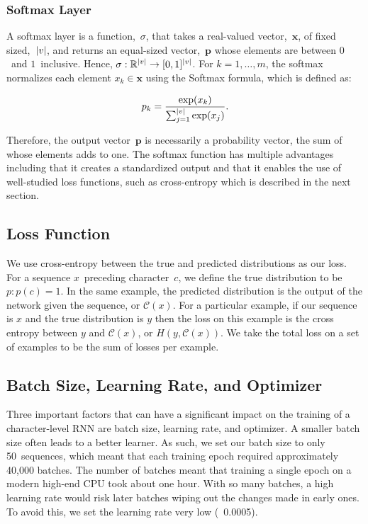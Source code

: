 \documentclass{article}
\DeclarePairedDelimiter\abs{\lvert}{\rvert}%
\begin{document}
\subsubsection{Softmax Layer}

A softmax layer is a function,~$\sigma$, that takes a real-valued vector,~$\mathbf{x}$, of fixed sized,~$\abs*{v}$, and returns an equal-sized vector,~$\mathbf{p}$ whose elements are between $0$~and $1$~inclusive.  Hence, $\sigma : \mathbb{R}^{\abs*{v}} \rightarrow [0,1]^{\abs*{v}}$. For $k=1,\ldots,m$, the softmax normalizes each element $x_k \in \mathbf{x}$ using the Softmax formula, which is defined as:

\begin{equation}
  p_k = \frac{\exp(x_k)}{\sum_{j=1}^{\abs*{v}} \exp(x_j)}\textrm{.}
\end{equation}

Therefore, the output vector~$\mathbf{p}$ is necessarily a probability vector, the sum of whose elements adds to one. The softmax function has multiple advantages including that it creates a standardized output and that it enables the use of well-studied loss functions, such as cross-entropy which is described in the next section.

\subsection{Loss Function}

We use cross-entropy between the true and predicted distributions as our loss. For a sequence $x$~preceding character~$c$, we define the true distribution to be $p: p(c) = 1$. In the same example, the predicted distribution is the output of the network given the sequence, or $\mathcal{C}(x)$. For a particular example, if our sequence is $x$ and the true distribution is $y$ then the loss on this example is the cross entropy between $y$ and $\mathcal{C}(x)$, or $H(y, \mathcal{C}(x))$. We take the total loss on a set of examples to be the sum of losses per example.

\subsection{Batch Size, Learning Rate, and Optimizer}

Three important factors that can have a significant impact on the training of a character-level RNN are batch size, learning rate, and optimizer.  A smaller batch size often leads to a better learner.  As such, we set our batch size to only 50~sequences, which meant that each training epoch required approximately 40,000 batches. The number of batches meant that training a single epoch on a modern high-end CPU took about one hour.  With so many batches, a high learning rate would risk later batches wiping out the changes made in early ones.  To avoid this, we set the learning rate very low (~0.0005). 
\end{document}

